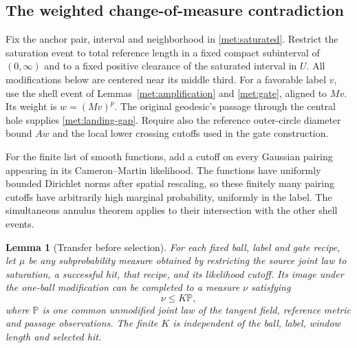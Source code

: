 \documentclass[11pt]{article}
\numberwithin{equation}{section}
\newtheorem{lemma}[theorem]{Lemma}
\theoremstyle{definition}
\theoremstyle{remark}
\newcommand{\1}{\mathbf 1}
\begin{document}
\subsection{The weighted change-of-measure contradiction}

Fix the anchor pair, interval and neighborhood in
\eqref{met:saturated}.  Restrict the saturation event to total
reference length in a fixed compact subinterval of $(0,\infty)$ and
to a fixed positive clearance of the saturated interval in $U$.
All modifications below are centered near its middle third.  For a
favorable label $v$, use the shell event of
Lemmas~\ref{met:amplification} and \ref{met:gate}, aligned to $Mv$.
Its weight is $w=(Mv)^p$.  The original geodesic's passage through the
central hole supplies \eqref{met:landing-gap}.  Require also the
reference outer-circle diameter bound $Aw$ and the local lower
crossing cutoffs used in the gate construction.

For the finite list of smooth functions, add a cutoff on every
Gaussian pairing appearing in its Cameron--Martin likelihood.  The
functions have uniformly bounded Dirichlet norms after spatial
rescaling, so these finitely many pairing cutoffs have arbitrarily
high marginal probability, uniformly in the label.  The simultaneous
annulus theorem applies to their intersection with the other shell
events.

\begin{lemma}[Transfer before selection]
\label{met:transfer-dominance}
For each fixed ball, label and gate recipe, let $\mu$ be any
subprobability measure obtained by restricting the source joint law
to saturation, a successful hit, that recipe, and its likelihood
cutoff.  Its image under the one-ball modification can be completed
to a measure $\nu$ satisfying
\begin{equation}
 \nu\leq K\mathbb P,
 \label{met:domination}
\end{equation}
where $\mathbb P$ is one common unmodified joint law of the tangent field,
reference metric and passage observations.  The finite $K$ is
independent of the ball, label, window length and selected hit.
\end{lemma}
\end{document}
